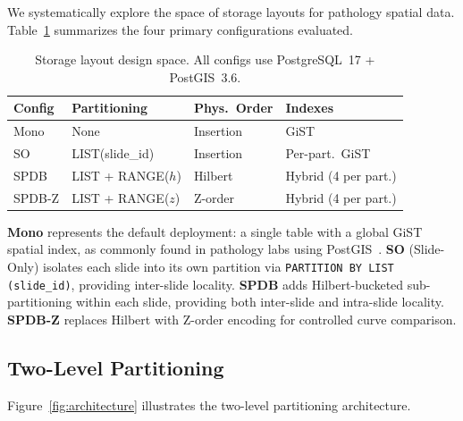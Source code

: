 \documentclass[sigconf]{acmart}
\begin{document}
We systematically explore the space of storage layouts for pathology spatial data.
Table~\ref{tab:designspace} summarizes the four primary configurations evaluated.

\begin{table}[t]
\centering
\caption{Storage layout design space. All configs use PostgreSQL~17 + PostGIS~3.6.}
\label{tab:designspace}
\scriptsize
\begin{tabular}{@{}llll@{}}
\toprule
\textbf{Config} & \textbf{Partitioning} & \textbf{Phys.\ Order} & \textbf{Indexes} \\
\midrule
Mono & None & Insertion & GiST \\
SO & LIST(slide\_id) & Insertion & Per-part.\ GiST \\
SPDB & LIST + RANGE($h$) & Hilbert & Hybrid (4 per part.) \\
SPDB-Z & LIST + RANGE($z$) & Z-order & Hybrid (4 per part.) \\
\bottomrule
\end{tabular}
\end{table}

\textbf{Mono} represents the default deployment: a single table with a global GiST spatial index, as commonly found in pathology labs using PostGIS~\cite{wang2011pais}.
\textbf{SO} (Slide-Only) isolates each slide into its own partition via \texttt{PARTITION BY LIST (slide\_id)}, providing inter-slide locality.
\textbf{SPDB} adds Hilbert-bucketed sub-partitioning within each slide, providing both inter-slide and intra-slide locality.
\textbf{SPDB-Z} replaces Hilbert with Z-order encoding for controlled curve comparison.

\subsection{Two-Level Partitioning}
\label{sec:two_level}

Figure~\ref{fig:architecture} illustrates the two-level partitioning architecture.
\end{document}
